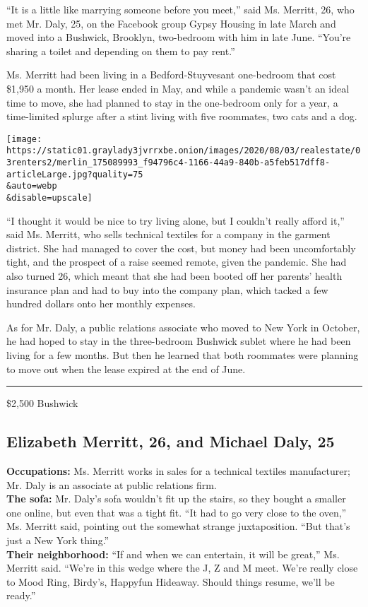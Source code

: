 ``It is a little like marrying someone before you meet,'' said Ms.
Merritt, 26, who met Mr. Daly, 25, on the Facebook group Gypsy Housing
in late March and moved into a Bushwick, Brooklyn, two-bedroom with him
in late June. ``You're sharing a toilet and depending on them to pay
rent.''

Ms. Merritt had been living in a Bedford-Stuyvesant one-bedroom that
cost \$1,950 a month. Her lease ended in May, and while a pandemic
wasn't an ideal time to move, she had planned to stay in the one-bedroom
only for a year, a time-limited splurge after a stint living with five
roommates, two cats and a dog.

\texttt{[image: https://static01.graylady3jvrrxbe.onion/images/2020/08/03/realestate/03renters2/merlin\_175089993\_f94796c4-1166-44a9-840b-a5feb517dff8-articleLarge.jpg?quality=75\\\&auto=webp\\\&disable=upscale]}

``I thought it would be nice to try living alone, but I couldn't really
afford it,'' said Ms. Merritt, who sells technical textiles for a
company in the garment district. She had managed to cover the cost, but
money had been uncomfortably tight, and the prospect of a raise seemed
remote, given the pandemic. She had also turned 26, which meant that she
had been booted off her parents' health insurance plan and had to buy
into the company plan, which tacked a few hundred dollars onto her
monthly expenses.

As for Mr. Daly, a public relations associate who moved to New York in
October, he had hoped to stay in the three-bedroom Bushwick sublet where
he had been living for a few months. But then he learned that both
roommates were planning to move out when the lease expired at the end of
June.

\begin{center}\rule{0.5\linewidth}{\linethickness}\end{center}

\$2,500 \textbar{} Bushwick

\hypertarget{elizabeth-merritt-26-and-michael-daly-25}{%
\subsection{Elizabeth Merritt, 26, and Michael Daly,
25}\label{elizabeth-merritt-26-and-michael-daly-25}}

\textbf{Occupations:} Ms. Merritt works in sales for a technical
textiles manufacturer; Mr. Daly is an associate at public relations
firm.\\
\textbf{The sofa:} Mr. Daly's sofa wouldn't fit up the stairs, so they
bought a smaller one online, but even that was a tight fit. ``It had to
go very close to the oven,'' Ms. Merritt said, pointing out the somewhat
strange juxtaposition. ``But that's just a New York thing.''\\
\textbf{Their neighborhood:} ``If and when we can entertain, it will be
great,'' Ms. Merritt said. ``We're in this wedge where the J, Z and M
meet. We're really close to Mood Ring, Birdy's, Happyfun Hideaway.
Should things resume, we'll be ready.''

